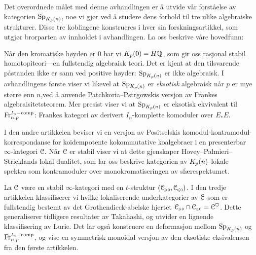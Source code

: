 Det overordnede målet med denne avhandlingen er å utvide vår forståelse av kategorien $\mathrm{Sp}_{K_p(n)}$, noe vi gjør ved å studere dens forhold til tre ulike algebraiske strukturer. Disse tre koblingene konstrueres i hver sin forskningsartikkel, som utgjør brorparten av innholdet i avhandlingen. La oss beskrive våre hovedfunn: 

Når den kromatiske høyden er $0$ har vi $K_p(0) = H\mathbb{Q}$, som gir oss rasjonal stabil homotopiteori---en fullstendig algebraisk teori. Det er kjent at den tilsvarende påstanden ikke er sann ved positive høyder: $\mathrm{Sp}_{K_p(n)}$ er ikke algebraisk. I avhandlingens første viser vi likevel at $\mathrm{Sp}_{K_p(n)}$ er \emph{eksotisk} algebraisk når $p$ er mye større enn $n$,ved å anvende Patchkoria--Pstr\a{}gowskis versjon av Frankes algebraisitetsteorem. Mer presist viser vi at $\mathrm{Sp}_{K_p(n)}$ er eksotisk ekvivalent til $\mathrm{Fr}_{n,p}^{I_n-\mathrm{comp}}$: Frankes kategori av derivert $I_n$-komplette komoduler over $E_*E$. 

I den andre artikkelen beviser vi en versjon av Positselskis komodul-kontramodul-korrespondanse for koidempotente kokommutative koalgebraer i en presenterbar $\infty$-kategori $\EuScript{C}$. Når $\EuScript{C}$ er stabil viser vi at dette gjenskaper Hovey--Palmieri--Stricklands lokal dualitet, som lar oss beskrive kategorien av ${K_p(n)}$-lokale spektra som kontramoduler over monokromatiseringen av sfærespektumet. 

La $\EuScript{C}$ være en stabil $\infty$-kategori med en $t$-struktur $(\EuScript{C}_{\hspace{-1pt}\scriptscriptstyle\geqslant 0}, \EuScript{C}_{\hspace{-1pt}\scriptscriptstyle\leqslant 0})$. I den tredje artikkelen klassifiserer vi hvilke lokaliserende underkategorier av $\EuScript{C}$ som er fullstendig bestemt av det Grothendieck-abelske hjertet $\EuScript{C}_{\hspace{-1pt}\scriptscriptstyle\geqslant 0} \cap \EuScript{C}_{\hspace{-1pt}\scriptscriptstyle\leqslant 0} = \EuScript{C}^\heartsuit$. Dette generaliserer tidligere resultater av Takahashi, og utvider en lignende klassifisering av Lurie. Det lar også konstruere en deformasjon mellom $\mathrm{Sp}_{K_p(n)}$ og $\mathrm{Fr}_{n,p}^{I_n-\mathrm{comp}}$, og vise en symmetrisk monoidal versjon av den eksotiske eksivalensen fra den første artikkelen. 



